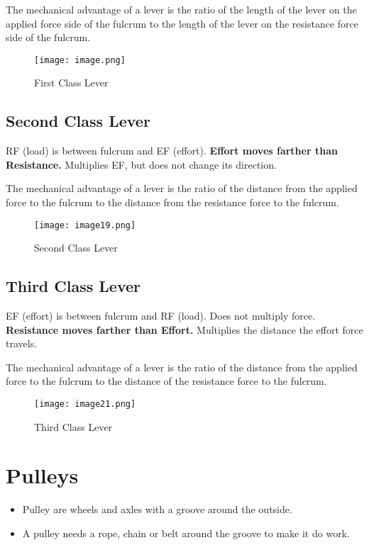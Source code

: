 \documentclass{article}
\begin{document}
\bigskip \noindent The mechanical advantage of a lever is the ratio of the length of the lever on the applied force side of the fulcrum to the length of the lever on the resistance force side of the fulcrum.

\begin{figure}[htp]
    \centering
    \texttt{[image: image.png]}
    \caption{First Class Lever}
\end{figure}

\subsection{Second Class Lever} 
RF (load) is between fulcrum and EF (effort). \textbf{Effort moves farther than Resistance.} Multiplies EF, but does not change its direction.

\bigskip \noindent The mechanical advantage of a lever is the ratio of the distance from the applied force to the fulcrum to the distance from the resistance force to the fulcrum.

\begin{figure}[htp]
    \centering
    \texttt{[image: image19.png]}
    \caption{Second Class Lever}
\end{figure}

\subsection{Third Class Lever}
EF (effort) is between fulcrum and RF (load). Does not multiply force. \textbf{Resistance moves farther than Effort.} Multiplies the distance the effort force travels.

\bigskip \noindent The mechanical advantage of a lever is the ratio of the distance from the applied force to the fulcrum to the distance of the resistance force to the fulcrum.

\begin{figure}[htp]
    \centering
    \texttt{[image: image21.png]}
    \caption{Third Class Lever}
\end{figure}

\section{Pulleys}
\begin{itemize}
    \item Pulley are wheels and axles with a groove around the outside.
    \item A pulley needs a rope, chain or belt around the groove to make it do work.
\end{itemize}
\end{document}
